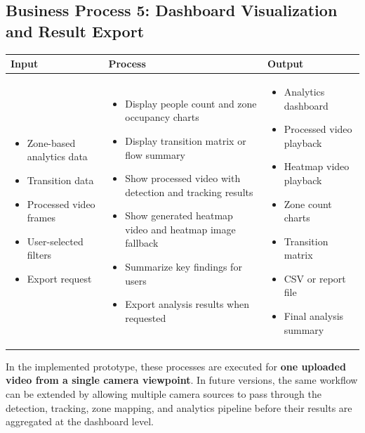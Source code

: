 \documentclass[12pt,a4paper]{report}
\begin{document}
\subsection*{Business Process 5: Dashboard Visualization and Result Export}
\begin{longtable}{|p{4.1cm}|p{5.0cm}|p{5.0cm}|}
\hline
\rowcolor{HeaderBlue}
\textbf{Input} & \textbf{Process} & \textbf{Output} \\
\hline

\begin{itemize}[leftmargin=*, nosep]
    \item Zone-based analytics data
    \item Transition data
    \item Processed video frames
    \item User-selected filters
    \item Export request
\end{itemize}
&
\begin{itemize}[leftmargin=*, nosep]
    \item Display people count and zone occupancy charts
    \item Display transition matrix or flow summary
    \item Show processed video with detection and tracking results
    \item Show generated heatmap video and heatmap image fallback
    \item Summarize key findings for users
    \item Export analysis results when requested
\end{itemize}
&
\begin{itemize}[leftmargin=*, nosep]
    \item Analytics dashboard
    \item Processed video playback
    \item Heatmap video playback
    \item Zone count charts
    \item Transition matrix
    \item CSV or report file
    \item Final analysis summary
\end{itemize}
\\
\hline
\end{longtable}

In the implemented prototype, these processes are executed for \textbf{one uploaded video from a single camera viewpoint}. 
In future versions, the same workflow can be extended by allowing multiple camera sources to pass through the detection, tracking, zone mapping, and analytics pipeline before their results are aggregated at the dashboard level.
\end{document}
